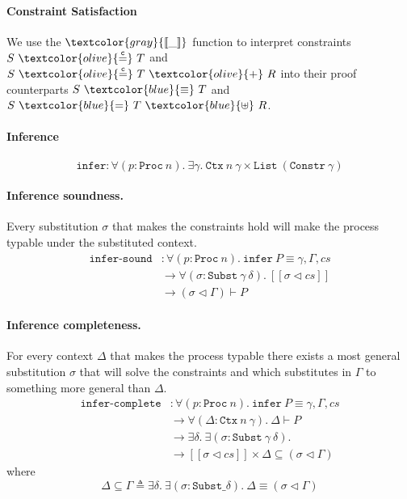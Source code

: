 \documentclass[sigplan,screen,review]{acmart}
\newcommand{\constr}[1]{\textcolor{olive}{\mathtt{#1}}}
\newcommand{\func}[1]{\textcolor{gray}{\mathtt{#1}}}
\newcommand{\type}[1]{\textcolor{blue}{\mathtt{#1}}}
\newcommand{\tSplit}[3]{#1~\type{=}~#2~\type{\uplus}~#3}
\newcommand{\tEq}[2]{#1~\type{\equiv}~#2}
\newcommand{\eqconstr}[2]{#1 ~ \constr{\stackrel{c}{=}} ~ #2}
\newcommand{\sumconstr}[3]{#1 ~ \constr{\stackrel{c}{=}} ~ #2 ~ \constr{+} ~ #3}
\begin{document}
\paragraph{Constraint Satisfaction}

We use the $\func{[\![\_]\!]}$ function to interpret constraints $\eqconstr{S}{T}$ and $\sumconstr{S}{T}{R}$ into their proof counterparts $\tEq{S}{T}$ and $\tSplit{S}{T}{R}$.


\paragraph{Inference}

\[
\texttt{infer} : \forall (p : \texttt{Proc}~n). ~ \exists \gamma. ~ \texttt{Ctx}~n~\gamma \times \texttt{List}~(\texttt{Constr}~\gamma)
\]

\paragraph{Inference soundness.}

Every substitution \(\sigma\) that makes the constraints hold will make
the process typable under the substituted context. \[
\begin{aligned}
\texttt{infer-sound} &: \forall (p : \texttt{Proc}~n). ~ \texttt{infer}~P \equiv \gamma , \Gamma , cs \\
&\to \forall (\sigma : \texttt{Subst}~\gamma~\delta). ~ [\![ \sigma \triangleleft cs ]\!] \\
&\to (\sigma \triangleleft \Gamma) \vdash P
\end{aligned}
\]

\paragraph{Inference completeness.}

For every context \(\Delta\) that makes the process typable there exists
a most general substitution \(\sigma\) that will solve the constraints
and which substitutes in \(\Gamma\) to something more general than
\(\Delta\). \[
\begin{aligned}
\texttt{infer-complete} &: \forall (p : \texttt{Proc}~n). ~ \texttt{infer}~P \equiv \gamma , \Gamma , cs \\
&\to \forall (\Delta : \texttt{Ctx}~n~\gamma). ~ \Delta \vdash P \\
&\to \exists \delta. ~ \exists (\sigma : \texttt{Subst}~\gamma~\delta). \\
&\to [\![ \sigma \triangleleft cs ]\!] \times \Delta \subseteq (\sigma \triangleleft \Gamma)
\end{aligned}
\] where \[
\Delta \subseteq \Gamma \triangleq \exists \delta. ~ \exists (\sigma : \texttt{Subst} \_ \delta). ~ \Delta \equiv (\sigma \triangleleft \Gamma)
\]
\end{document}
